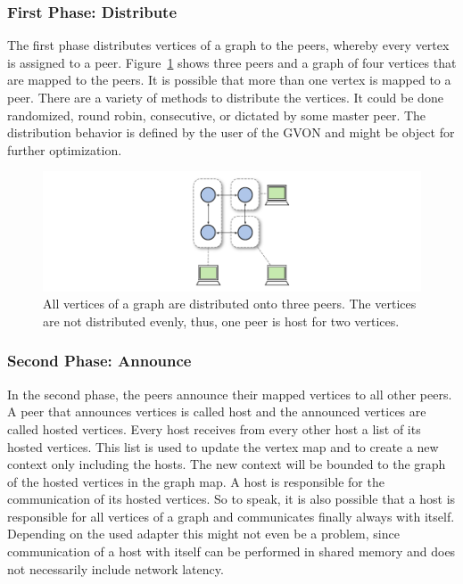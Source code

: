 \subsubsection*{First Phase: Distribute}
The first phase distributes vertices of a graph to the peers, whereby
every vertex is assigned to a peer.  Figure~\ref{fig:gvon_mapping}
shows three peers and a graph of four vertices that are mapped to the
peers. It is possible that more than one vertex is mapped to a peer.
There are a variety of methods to distribute the vertices.  It could be
done randomized, round robin, consecutive, or dictated by
some master peer. The distribution behavior is defined by the user of
the GVON and might be object for further optimization.

\begin{figure}[H]
  \centering \includegraphics[width=\textwidth]{graphics/30_gvon_mapping}
  \caption{All vertices of a graph are distributed onto three
    peers. The vertices are not distributed evenly, thus, one peer is
    host for two vertices.}
  \label{fig:gvon_mapping}
\end{figure}

\subsubsection*{Second Phase: Announce}
In the second phase, the peers announce their mapped vertices to all
other peers.  A peer that announces vertices is called host and the
announced vertices are called hosted vertices.  Every host receives
from every other host a list of its hosted vertices.  This list is
used to update the vertex map and to create a new context only
including the hosts. The new context will be bounded to the graph of
the hosted vertices in the graph map.  A host is responsible for the
communication of its hosted vertices.  So to speak, it is also
possible that a host is responsible for all vertices of a graph and
communicates finally always with itself.  Depending on the used
adapter this might not even be a problem, since communication of a
host with itself can be performed in shared memory and does not
necessarily include network latency.


